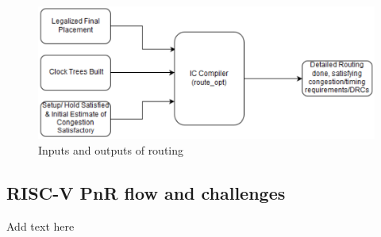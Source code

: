 \documentclass[../main.tex]{subfiles}
\begin{document}
\begin{figure}[h]
    \centering
    \includegraphics[width=15cm]{diagrams/IO_routing.PNG}
    \caption{ Inputs and outputs of routing}
    \label{fig:IO_routing}
\end{figure}
\subsection{ RISC-V PnR flow and challenges}
    Add text here
\end{document}
